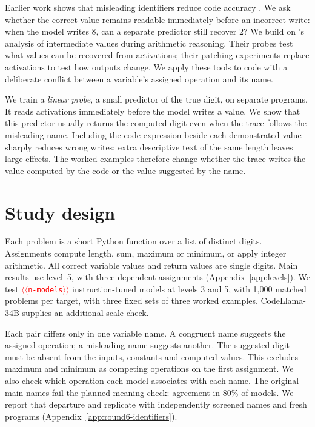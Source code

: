 \documentclass[11pt]{article}
\providecommand{\NUM}[1]{\textcolor{red}{$\langle\langle$\texttt{#1}$\rangle\rangle$}}
\begin{document}
Earlier work shows that misleading identifiers reduce code accuracy
\cite{le2025names,lam2025codecrash,le2026obfuscated}. We ask whether the correct value remains
readable immediately before an incorrect write: when the model writes 8, can a separate
predictor still recover 2? We build on
\citet{kudo2026faithful}'s analysis of intermediate values during arithmetic reasoning.
Their probes test what values can be recovered from activations; their patching experiments
replace activations to test how outputs change. We apply these tools to code with a
deliberate conflict between a variable's assigned operation and its name.

We train a \emph{linear probe}, a small predictor of the true digit, on separate programs.
It reads activations immediately before the model writes a value. We show that this
predictor usually returns the computed digit even when the trace follows the misleading
name. Including the code expression beside each demonstrated value sharply reduces wrong writes;
extra descriptive text of the same length leaves large effects. The worked examples
therefore change whether the trace writes the value computed by the code or the value
suggested by the name.

\section{Study design}

Each problem is a short Python function over a list of distinct digits. Assignments
compute length, sum, maximum or minimum, or apply integer arithmetic. All correct variable
values and return values are single digits. Main results use level~5, with three dependent assignments
(Appendix~\ref{app:levels}).
We test \NUM{n-models} instruction-tuned models at levels 3 and 5, with 1,000 matched problems per target,
with three fixed sets of three worked examples. CodeLlama-34B supplies an additional scale check.

Each pair differs only in one variable name. A congruent name suggests the assigned
operation; a misleading name suggests another. The suggested digit must be absent from
the inputs, constants and computed values. This excludes maximum and minimum as competing
operations on the first assignment. We also check which operation each model associates
with each name. The original main names fail the planned meaning check: agreement in 80\%
of models. We report that departure and replicate with independently screened names and fresh programs
(Appendix~\ref{app:round6-identifiers}).
\end{document}
